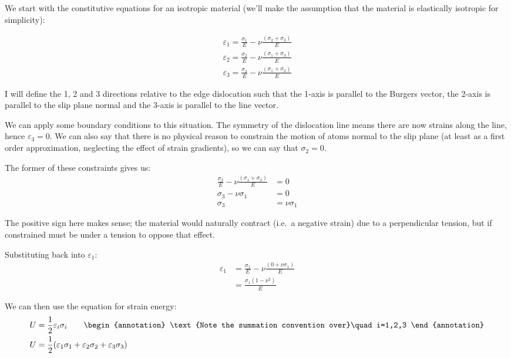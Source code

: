 \FloatBarrier
We start with the constitutive equations for an isotropic material (we'll make the assumption that the material is elastically isotropic for simplicity):

\begin{align*}
\varepsilon_1 = \frac{\sigma_1}{E} - \nu \frac{(\sigma_2 + \sigma_3)}{E} \\
\varepsilon_2 = \frac{\sigma_2}{E} - \nu \frac{(\sigma_1 + \sigma_3)}{E} \\
\varepsilon_3 = \frac{\sigma_3}{E} - \nu \frac{(\sigma_1 + \sigma_2)}{E} 
\end{align*}

I will define the 1, 2 and 3 directions relative to the edge dislocation such that the 1-axis is parallel to the Burgers vector, the 2-axis is parallel to the slip plane normal and the 3-axis is parallel to the line vector.


We can apply some boundary conditions to this situation. The symmetry of the dislocation line means there are now strains along the line, hence $\varepsilon_3 = 0$. We can also say that there is no physical reason to constrain the motion of atoms normal to the slip plane (at least as a first order approximation, neglecting the effect of strain gradients), so we can say that $\sigma_2 = 0$.

The former of these constraints gives us:
\begin{align*}
\frac{\sigma_3}{E} - \nu \frac{(\sigma_1 + \sigma_2)}{E} &= 0 \\
\sigma_3 - \nu \sigma_1 &= 0 \\
\sigma_3 &= \nu \sigma_1
\end{align*}

The positive sign here makes sense; the material would naturally contract (i.e.\ a negative strain) due to a perpendicular tension, but if constrained must be under a tension to oppose that effect.

Substituting back into $\varepsilon_1$:
\begin{align}
\varepsilon_1 &= \frac{\sigma_1}{E} - \nu \frac{(0 + \nu \sigma_1)}{E} \nonumber\\
&=\frac{\sigma_1 (1-\nu^2)}{E}\label{eqn:strain_one}
\end{align}

We can then use the equation for strain energy:
\begin{align*}
U &= \dfrac{1}{2} \varepsilon_i \sigma_i \qquad\begin{annotation}
\text{Note the summation convention over}\quad i=1,2,3 
\end{annotation}\\
U &= \dfrac{1}{2}(\varepsilon_1 \sigma_1 + \varepsilon_2 \sigma_2 + \varepsilon_3 \sigma_3)
\end{align*}

